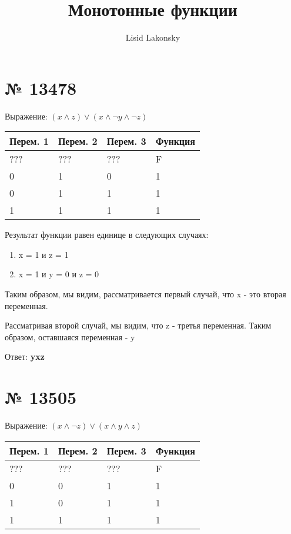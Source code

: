 \documentclass[11pt]{article} %
\title{Монотонные функции}
\author{Lisid Lakonsky}
\begin{document}
\maketitle

\section{№ \textbf{13478}}

Выражение: $(x \land z) \lor (x \land \lnot{y} \land \lnot{z})$

\vspace{2mm}
\begin{tabular}{ | l | l | l | l | }
\hline
Перем. 1 & Перем. 2 & Перем. 3 & Функция \\ \hline
??? & ??? & ??? & F \\ \hline
0 & 1 & 0 & 1 \\ \hline
0 & 1 & 1 & 1 \\ \hline
1 & 1 & 1 & 1 \\ \hline
\end{tabular}

\vspace{2mm}

Результат функции равен единице в следующих случаях:

\begin{enumerate}
	\item x = 1 и z = 1
	\item x = 1 и y = 0 и z = 0
\end{enumerate}

Таким образом, мы видим, рассматривается первый случай, что x - это вторая переменная.

Рассматривая второй случай, мы видим, что z - третья переменная. Таким образом, оставшаяся переменная - y

Ответ: \textbf{yxz}

\section{№ \textbf{13505}}

Выражение: $(x \land \lnot{z}) \lor (x \land y \land z)$

\vspace{2mm}
\begin{tabular}{ | l | l | l | l | }
\hline
Перем. 1 & Перем. 2 & Перем. 3 & Функция \\ \hline
??? & ??? & ??? & F \\ \hline
0 & 0 & 1 & 1 \\ \hline
1 & 0 & 1 & 1 \\ \hline
1 & 1 & 1 & 1 \\ \hline
\end{tabular}
\end{document}
